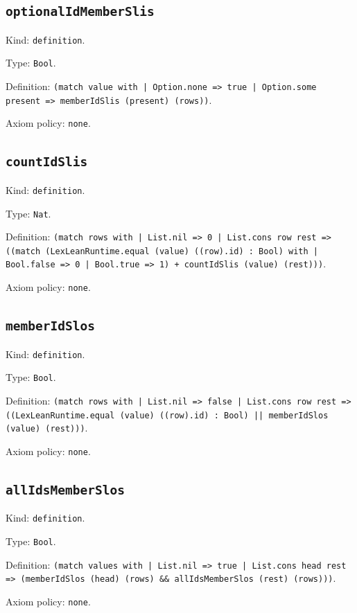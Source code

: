 \documentclass[11pt]{article}
\begin{document}
\subsection*{\texttt{optionalIdMemberSlis}}
\noindent Kind: \texttt{definition}.\par
\noindent Type: \texttt{Bool}.\par
\noindent Definition: \texttt{(match value with | Option.none => true | Option.some present => memberIdSlis (present) (rows))}.\par
\noindent Axiom policy: \texttt{none}.\par
\subsection*{\texttt{countIdSlis}}
\noindent Kind: \texttt{definition}.\par
\noindent Type: \texttt{Nat}.\par
\noindent Definition: \texttt{(match rows with | List.nil => 0 | List.cons row rest => ((match (LexLeanRuntime.equal (value) ((row).id) : Bool) with | Bool.false => 0 | Bool.true => 1) + countIdSlis (value) (rest)))}.\par
\noindent Axiom policy: \texttt{none}.\par
\subsection*{\texttt{memberIdSlos}}
\noindent Kind: \texttt{definition}.\par
\noindent Type: \texttt{Bool}.\par
\noindent Definition: \texttt{(match rows with | List.nil => false | List.cons row rest => ((LexLeanRuntime.equal (value) ((row).id) : Bool) || memberIdSlos (value) (rest)))}.\par
\noindent Axiom policy: \texttt{none}.\par
\subsection*{\texttt{allIdsMemberSlos}}
\noindent Kind: \texttt{definition}.\par
\noindent Type: \texttt{Bool}.\par
\noindent Definition: \texttt{(match values with | List.nil => true | List.cons head rest => (memberIdSlos (head) (rows) \&\& allIdsMemberSlos (rest) (rows)))}.\par
\noindent Axiom policy: \texttt{none}.\par
\end{document}
